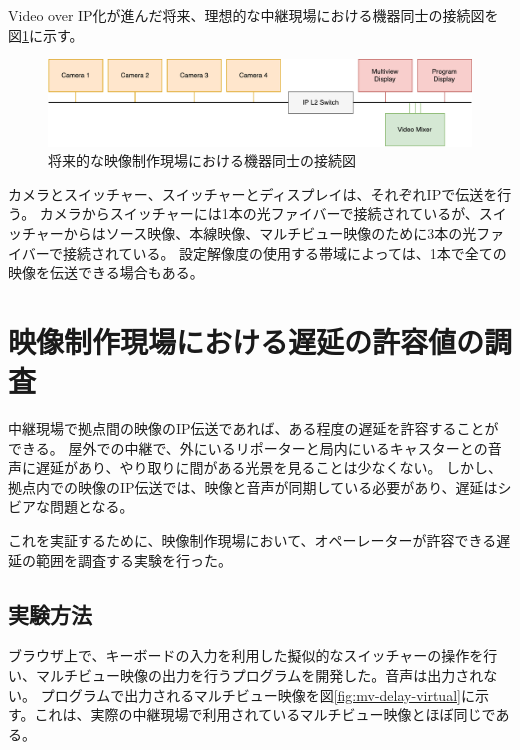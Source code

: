 Video over IP化が進んだ将来、理想的な中継現場における機器同士の接続図を図\ref{fig:broadcast-diagram-on-ip}に示す。

\begin{figure}[htbp]
  \begin{center}
    \includegraphics[bb=0 0 787 161,width=15cm]{img/broadcast-diagram-on-ip.pdf}
  \end{center}
  \caption{将来的な映像制作現場における機器同士の接続図}
  \label{fig:broadcast-diagram-on-ip}
\end{figure}

カメラとスイッチャー、スイッチャーとディスプレイは、それぞれIPで伝送を行う。
カメラからスイッチャーには1本の光ファイバーで接続されているが、スイッチャーからはソース映像、本線映像、マルチビュー映像のために3本の光ファイバーで接続されている。
設定解像度の使用する帯域によっては、1本で全ての映像を伝送できる場合もある。

\section{映像制作現場における遅延の許容値の調査}

中継現場で拠点間の映像のIP伝送であれば、ある程度の遅延を許容することができる。
屋外での中継で、外にいるリポーターと局内にいるキャスターとの音声に遅延があり、やり取りに間がある光景を見ることは少なくない。
しかし、拠点内での映像のIP伝送では、映像と音声が同期している必要があり、遅延はシビアな問題となる。

これを実証するために、映像制作現場において、オペーレーターが許容できる遅延の範囲を調査する実験を行った。

\subsection{実験方法}

ブラウザ上で、キーボードの入力を利用した擬似的なスイッチャーの操作を行い、マルチビュー映像の出力を行うプログラムを開発した。音声は出力されない。
プログラムで出力されるマルチビュー映像を図\ref{fig:mv-delay-virtual}に示す。これは、実際の中継現場で利用されているマルチビュー映像とほぼ同じである。

